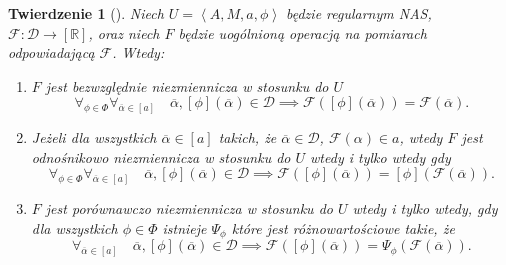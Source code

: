 \documentclass[12pt,a4paper]{report}
\newtheorem{tw}[definition]{Twierdzenie}
\newcommand{\domkniecie}[1]{\left[ {#1} \right] }
\newcommand{\tuple}[1]{\left\langle {#1} \right\rangle}
\begin{document}
\begin{tw}[{\citep[Tw. 2]{adams1965theory}}]
Niech $U=\tuple{A,M,a,\phi}$ będzie regularnym NAS, $\mathcal{F}:\mathcal{D}\to \domkniecie{\mathbb{R}}$, oraz niech $F$ będzie uogólnioną operacją na pomiarach odpowiadającą $\mathcal{F}$. Wtedy:
\begin{enumerate}
\item
$F$ jest bezwzględnie niezmiennicza w stosunku do $U$ 
$$
\forall_{\phi \in \Phi} \forall_{\overline{\alpha} \in \domkniecie{a}} \quad \overline{\alpha}, \domkniecie{\phi}(\overline{\alpha}) \in \mathcal{D} \implies \mathcal{F}(\domkniecie{\phi}(\overline{\alpha}))=\mathcal{F}(\overline{\alpha}).
$$
\item
Jeżeli dla wszystkich $\overline{\alpha} \in \domkniecie{a}$ takich, że $\overline{\alpha} \in \mathcal{D}$, $\mathcal{F}(\alpha)\in a$, wtedy $F$ jest odnośnikowo niezmiennicza w stosunku do $U$ wtedy i tylko wtedy gdy 
\begin{equation*}
\forall_{\phi \in \Phi} \forall_{\overline{\alpha} \in \domkniecie{a}} \quad \overline{\alpha}, \domkniecie{\phi}(\overline{\alpha}) \in \mathcal{D} \implies \mathcal{F}(\domkniecie{\phi}(\overline{\alpha}))=\domkniecie{\phi}(\mathcal{F}(\overline{\alpha})).
\end{equation*}
\item
$F$ jest porównawczo niezmiennicza w stosunku do $U$ wtedy i tylko wtedy, gdy dla wszystkich $\phi \in \Phi$ istnieje $\Psi_{\phi}$ które jest różnowartościowe takie, że
$$
 \forall_{\overline{\alpha} \in \domkniecie{a}} \quad \overline{\alpha}, \domkniecie{\phi}(\overline{\alpha}) \in \mathcal{D} \implies \mathcal{F}(\domkniecie{\phi}(\overline{\alpha}))=\Psi_{\phi}(\mathcal{F}(\overline{\alpha})).
$$
\end{enumerate}
\end{tw}
\end{document}

